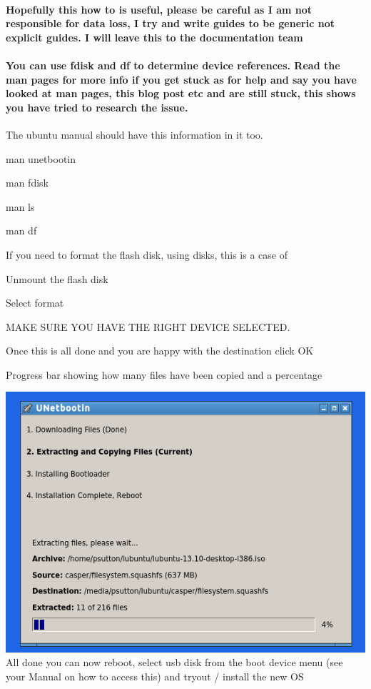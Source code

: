 \documentclass[12pt,a4paper]{book}
\begin{document}
\paragraph{Hopefully this how to is useful,  please be careful as I am not responsible for data loss,  I try and write guides to be generic not explicit guides.  I will leave this to the documentation team}

\paragraph{You can use fdisk and df to determine device references. Read the man pages for more info if you get stuck as for help and say you have looked at man pages,  this blog post etc and are still stuck,  this shows you have tried to research the issue.}

The ubuntu manual should have this information in it too.

man unetbootin

man fdisk

man ls

man df

If you need to format the flash disk, using disks, this is a case of

Unmount the flash disk

Select format

MAKE SURE YOU HAVE THE RIGHT DEVICE SELECTED.

Once this is all done and you are happy with the destination click OK

Progress bar showing how many files have been copied and a percentage


\includegraphics[width=0.7\linewidth]{unetbootin5} \\

All done you can now reboot, select usb disk from the boot device menu (see your Manual on how to access this) and tryout /  install the new OS
\end{document}
